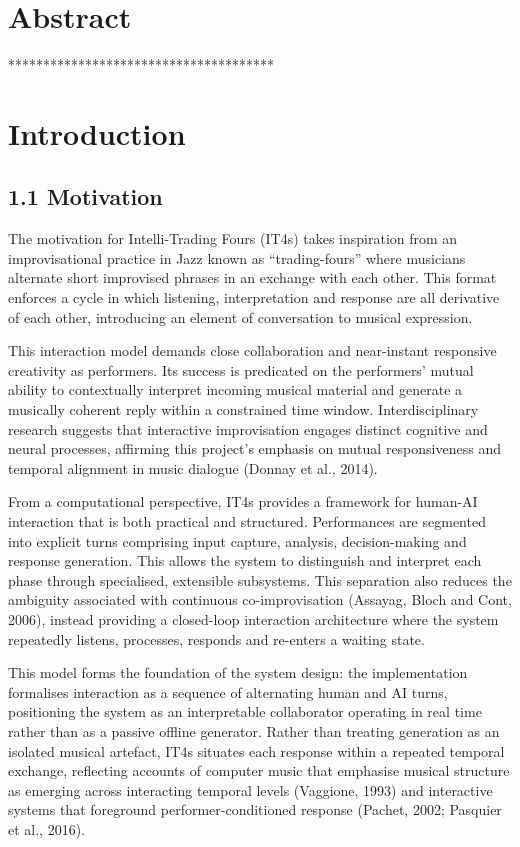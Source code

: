 \section{Abstract}\label{abstract}

**************************************

\section{Introduction}\label{introduction}

\subsection{1.1 Motivation}\label{motivation}

The motivation for Intelli-Trading Fours (IT4s) takes inspiration from
an improvisational practice in Jazz known as ``trading-fours'' where
musicians alternate short improvised phrases in an exchange with each
other. This format enforces a cycle in which listening, interpretation
and response are all derivative of each other, introducing an element of
conversation to musical expression.

This interaction model demands close collaboration and near-instant
responsive creativity as performers. Its success is predicated on the
performers' mutual ability to contextually interpret incoming musical
material and generate a musically coherent reply within a constrained
time window. Interdisciplinary research suggests that interactive
improvisation engages distinct cognitive and neural processes, affirming
this project's emphasis on mutual responsiveness and temporal alignment
in music dialogue (Donnay et al., 2014).

From a computational perspective, IT4s provides a framework for human-AI
interaction that is both practical and structured. Performances are
segmented into explicit turns comprising input capture, analysis,
decision-making and response generation. This allows the system to
distinguish and interpret each phase through specialised, extensible
subsystems. This separation also reduces the ambiguity associated with
continuous co-improvisation (Assayag, Bloch and Cont, 2006), instead
providing a closed-loop interaction architecture where the system
repeatedly listens, processes, responds and re-enters a waiting state.

This model forms the foundation of the system design: the implementation
formalises interaction as a sequence of alternating human and AI turns,
positioning the system as an interpretable collaborator operating in
real time rather than as a passive offline generator. Rather than
treating generation as an isolated musical artefact, IT4s situates each
response within a repeated temporal exchange, reflecting accounts of
computer music that emphasise musical structure as emerging across
interacting temporal levels (Vaggione, 1993) and interactive systems
that foreground performer-conditioned response (Pachet, 2002; Pasquier
et al., 2016).

